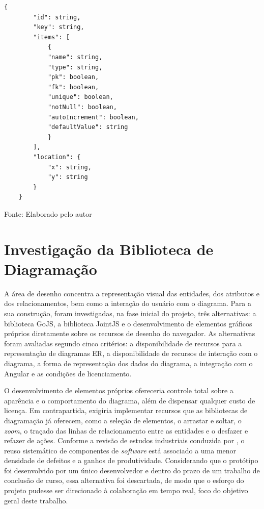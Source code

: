 \begin{quadro}[H]
    \begin{lstlisting}[frame=single, framesep=5pt, xleftmargin=5pt, xrightmargin=5pt]
    {
        "id": string,
        "key": string,
        "items": [
            {
            "name": string,
            "type": string,
            "pk": boolean,
            "fk": boolean,
            "unique": boolean,
            "notNull": boolean,
            "autoIncrement": boolean,
            "defaultValue": string
            }
        ],
        "location": {
            "x": string,
            "y": string
        }
    }
    \end{lstlisting}
    \caption{Estrutura de dados do campo \textit{nodeData}}
    \begin{center}
        {\small Fonte: Elaborado pelo autor}
    \end{center}
    \label{lst:node-data}
\end{quadro}

\section{Investigação da Biblioteca de Diagramação}
\label{sec:investigacao-biblioteca}

A área de desenho concentra a representação visual das entidades, dos atributos e dos relacionamentos, bem como a interação do usuário com o diagrama. Para a sua construção, foram investigadas, na fase inicial do projeto, três alternativas: a biblioteca GoJS, a biblioteca JointJS e o desenvolvimento de elementos gráficos próprios diretamente sobre os recursos de desenho do navegador. As alternativas foram avaliadas segundo cinco critérios: a disponibilidade de recursos para a representação de diagramas ER, a disponibilidade de recursos de interação com o diagrama, a forma de representação dos dados do diagrama, a integração com o Angular e as condições de licenciamento.

O desenvolvimento de elementos próprios ofereceria controle total sobre a aparência e o comportamento do diagrama, além de dispensar qualquer custo de licença. Em contrapartida, exigiria implementar recursos que as bibliotecas de diagramação já oferecem, como a seleção de elementos, o arrastar e soltar, o \textit{zoom}, o traçado das linhas de relacionamento entre as entidades e o desfazer e refazer de ações. Conforme a revisão de estudos industriais conduzida por , o reuso sistemático de componentes de \textit{software} está associado a uma menor densidade de defeitos e a ganhos de produtividade. Considerando que o protótipo foi desenvolvido por um único desenvolvedor e dentro do prazo de um trabalho de conclusão de curso, essa alternativa foi descartada, de modo que o esforço do projeto pudesse ser direcionado à colaboração em tempo real, foco do objetivo geral deste trabalho.

